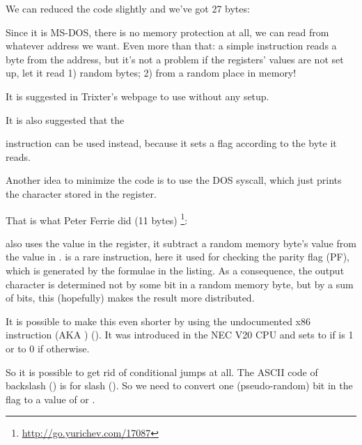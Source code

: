 We can reduced the code slightly and we've got 27 bytes:




Since it is MS-DOS, there is no memory protection at all, we can read from whatever address we want.
Even more than that: a simple  
instruction reads a byte from the  address, but it's not a problem
if the registers' values are not set up, let it read 1) random bytes; 2) from a random place in memory!

It is suggested in Trixter's webpage\FNURLTRIXTER 
to use  without any setup.

It is also suggested that the  

instruction can be used instead, because it sets a flag according to the byte it reads.


Another idea to minimize the code is to use the  DOS syscall, which just prints the character stored in the  register.

That is what Peter Ferrie \AndENRU \HERMIT{} did (11  bytes)
\footnote{\url{http://go.yurichev.com/17087}}:



 also uses the value in the 
 register, it subtract a random memory byte's value from the  value in .
 is a rare instruction, here it used for checking the parity flag (PF), 
which is generated by the formulae in the listing.
As a consequence, the output character 
is determined not by some bit in a random memory byte, but by a sum of bits, 
this (hopefully) makes the result more distributed.

It is possible to 
make this even shorter by using the undocumented x86 instruction  (\ac{AKA} ) ().
It was introduced in the NEC V20 \ac{CPU} and sets  to 
 if  is 1 or to 0 if otherwise.



So it is possible to get rid of conditional jumps at all.
The \ac{ASCII} code of backslash (\q{\textbackslash{}}) 
is  \AndENRU {} for slash (\q{/}).
So we need to convert one (pseudo-random) bit in the  flag to a value of  or .%


